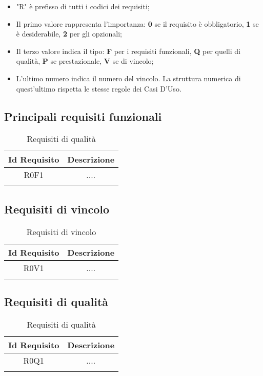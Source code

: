 \begin{itemize}
	\item "R" è prefisso di tutti i codici dei requisiti;
	\item Il primo valore rappresenta l'importanza: \textbf{0} se il requisito è obbligatorio, \textbf{1} se è desiderabile, \textbf{2} per gli opzionali;
	\item Il terzo valore indica il tipo: \textbf{F} per i requisiti funzionali, \textbf{Q} per quelli di qualità, \textbf{P} se prestazionale, \textbf{V} se di vincolo;
	\item L'ultimo numero indica il numero del vincolo. La struttura numerica di quest'ultimo rispetta le stesse regole dei Casi D'Uso.
\end{itemize}

\subsection{Principali requisiti funzionali}
\begin{longtable}{|c|c|}
	\hline
	\textbf{Id Requisito} & \textbf{Descrizione}\\
	\hline
	\endhead
	R0F1 & ....  \\ \hline 
	\caption{Requisiti di qualità}
	\label{tabella:req}
\end{longtable}

\subsection{Requisiti di vincolo}
\begin{longtable}{|c|c|}
	\hline
	\textbf{Id Requisito} & \textbf{Descrizione}\\
	\hline
	\endhead
	R0V1 & ....  \\ \hline 
	\caption{Requisiti di vincolo}
	\label{tabella:reqV}
\end{longtable}

\subsection{Requisiti di qualità}
\begin{longtable}{|c|c|}
	\hline
	\textbf{Id Requisito} & \textbf{Descrizione}\\
	\hline
	\endhead
	R0Q1 & ....  \\ \hline 
	\caption{Requisiti di qualità}
	\label{tabella:reqQ}
\end{longtable}

